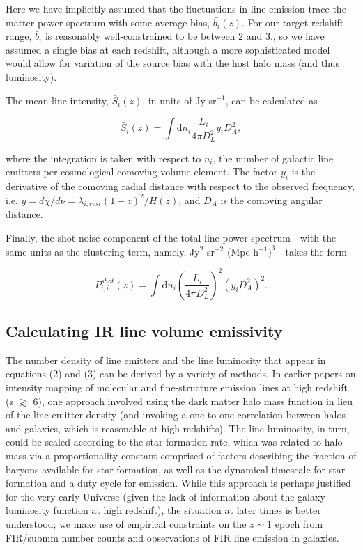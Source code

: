 \documentclass[iop,twocolappendix]{emulateapj}
\begin{document}
Here we have implicitly assumed that the fluctuations in line emission trace the matter power spectrum with some average bias, $\bar{b_i}(z)$. For our target redshift range, $\bar{b}_i$ is reasonably well-constrained to be between 2 and 3.\citep{Cooray10, Jullo12}, so we have assumed a single bias at each redshift, although a more sophisticated model would allow for variation of the source bias with the host halo mass (and thus luminosity). 

The mean line intensity, $\bar{S}_{i}(z)$, in units of Jy sr$^{-1}$, can be calculated as

\begin{equation}
\bar{S}_{i}(z) = \int{\mathrm{d}n_{i} \frac{L_{i}}{4\pi D_L^2}} y_i D_A^2 ,
\label{eq:si}
\end{equation}

where the integration is taken with respect to $n_{i}$, the number of galactic line emitters per cosmological comoving volume element. The factor $y_i$ is the derivative of the comoving radial distance with respect to the observed frequency, i.e. $y = d\chi/d\nu = \lambda_{i,rest} (1+z)^2/H(z)$, and $D_A$ is the comoving angular distance.

Finally, the shot noise component of the total line power spectrum---with the same units as the clustering term, namely, Jy$^2$ sr$^{-2}$ (Mpc h$^{-1})^{3}$---takes the form 

\begin{equation}
P_{i,i}^{shot}(z) = \int{\mathrm{d}n_{i} \left( \frac{L_{i}}{4\pi D_L^2} \right)^2 \left( y_i D_A^2 \right)^2}.
 \label{eq:pshot}
\end{equation}

\subsection{Calculating IR line volume emissivity}

The number density of line emitters and the line luminosity that appear in equations (2) and (3) can be derived by a variety of methods. In earlier papers on intensity mapping of molecular and fine-structure emission lines at high redshift (z $\gtrsim$ 6), one approach involved using the dark matter halo mass function in lieu of the line emitter density (and invoking a one-to-one correlation between halos and galaxies, which is reasonable at high redshifts). The line luminosity, in turn, could be scaled according to the star formation rate, which was related to halo mass via a proportionality constant comprised of factors describing the fraction of baryons available for star formation, as well as the dynamical timescale for star formation and a duty cycle for emission. While this approach is perhaps justified for the very early Universe (given the lack of information about the galaxy luminosity function at high redshift), the situation at later times is better understood; we make use of empirical constraints on the $z\sim1$ epoch from FIR/submm number counts and observations of FIR line emission in galaxies. 
\end{document}
